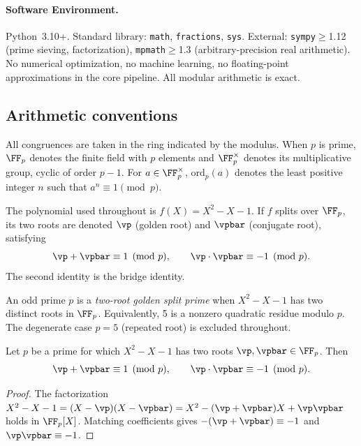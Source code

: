 \paragraph{Software Environment.}
Python~3.10+. Standard library: \texttt{math}, \texttt{fractions}, \texttt{sys}. External: \texttt{sympy}$\geq$1.12 (prime sieving, factorization), \texttt{mpmath}$\geq$1.3 (arbitrary-precision real arithmetic). No numerical optimization, no machine learning, no floating-point approximations in the core pipeline. All modular arithmetic is exact.

\subsection{Arithmetic conventions}

All congruences are taken in the ring indicated by the modulus. When $p$ is prime, $\FF_p$ denotes the finite field with $p$ elements and $\FF_p^\times$ denotes its multiplicative group, cyclic of order $p - 1$. For $a \in \FF_p^\times$, $\mathrm{ord}_p(a)$ denotes the least positive integer $n$ such that $a^n \equiv 1 \pmod{p}$.

The polynomial used throughout is $f(X) = X^2 - X - 1$. If $f$ splits over $\FF_p$, its two roots are denoted $\vp$ (golden root) and $\vpbar$ (conjugate root), satisfying
\[
\vp + \vpbar \equiv 1 \pmod{p}, \qquad \vp \cdot \vpbar \equiv -1 \pmod{p}.
\]
The second identity is the bridge identity.

\begin{definition}
An odd prime $p$ is a \emph{two-root golden split prime} when $X^2 - X - 1$ has two distinct roots in $\FF_p$. Equivalently, 5 is a nonzero quadratic residue modulo $p$. The degenerate case $p = 5$ (repeated root) is excluded throughout.
\end{definition}

\begin{lemma}\label{lem:rootprod}
Let $p$ be a prime for which $X^2 - X - 1$ has two roots $\vp, \vpbar \in \FF_p$. Then
\[
\vp + \vpbar \equiv 1 \pmod{p}, \qquad \vp \cdot \vpbar \equiv -1 \pmod{p}.
\]
\end{lemma}

\begin{proof}
The factorization $X^2 - X - 1 = (X - \vp)(X - \vpbar) = X^2 - (\vp + \vpbar)X + \vp\vpbar$ holds in $\FF_p[X]$. Matching coefficients gives $-(\vp + \vpbar) \equiv -1$ and $\vp\vpbar \equiv -1$. \qedhere
\end{proof}

